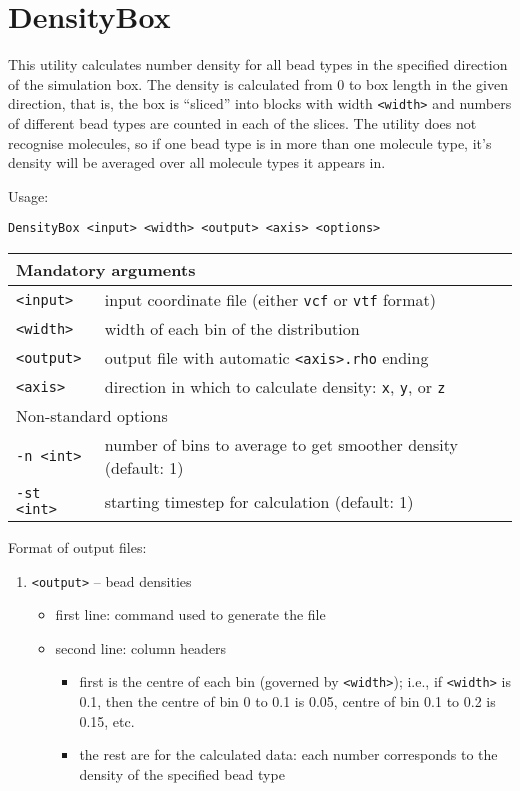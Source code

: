 \section{DensityBox} \label{sec:DensityBox}

This utility calculates number density for all bead types in the specified
direction of the simulation box. The density is calculated from 0 to box
length in the given direction, that is, the box is \enquote{sliced} into
blocks with width \texttt{<width>} and numbers of different bead types are
counted in each of the slices. The utility does not recognise molecules, so
if one bead type is in more than one molecule type, it's density will be
averaged over all molecule types it appears in.

Usage:

\vspace{1em}
\noindent
\texttt{DensityBox <input> <width> <output> <axis> <options>}

\noindent
\begin{longtable}{p{}p{}}
  \toprule
  \multicolumn{2}{l}{Mandatory arguments} \\
  \midrule
  \texttt{<input>} & input coordinate file (either \texttt{vcf} or
    \texttt{vtf} format) \\
  \texttt{<width>} & width of each bin of the distribution \\
  \texttt{<output>} & output file with automatic \texttt{<axis>.rho} ending \\
  \texttt{<axis>} & direction in which to calculate density: \texttt{x},
    \texttt{y}, or \texttt{z} \\
  \toprule
  \multicolumn{2}{l}{Non-standard options} \\
  \midrule
  \texttt{-n <int>} & number of bins to average to get smoother density
    (default: 1) \\
  \texttt{-st <int>} & starting timestep for calculation (default: 1) \\
  \bottomrule
\end{longtable}

\noindent
Format of output files:
\begin{enumerate}[nosep,leftmargin=20pt]
  \item \texttt{<output>} -- bead densities
    \begin{itemize}[nosep,leftmargin=5pt]
      \item first line: command used to generate the file
      \item second line: column headers
        \begin{itemize}[nosep,leftmargin=5pt]
          \item first is the centre of each bin (governed by
            \texttt{<width>}); i.e., if \texttt{<width>} is 0.1,
            then the centre of bin 0 to 0.1 is 0.05, centre of bin 0.1 to
            0.2 is 0.15, etc.
          \item the rest are for the calculated data: each number
            corresponds to the density of the specified bead type
        \end{itemize}
    \end{itemize}
\end{enumerate}
